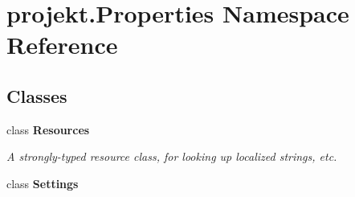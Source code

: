 \hypertarget{namespaceprojekt_1_1_properties}{}\section{projekt.\+Properties Namespace Reference}
\label{namespaceprojekt_1_1_properties}
\subsection*{Classes}
\begin{DoxyCompactItemize}
\item 
class {\bfseries Resources}
\begin{DoxyCompactList}\small\item\em A strongly-\/typed resource class, for looking up localized strings, etc. \end{DoxyCompactList}\item 
class {\bfseries Settings}
\end{DoxyCompactItemize}
